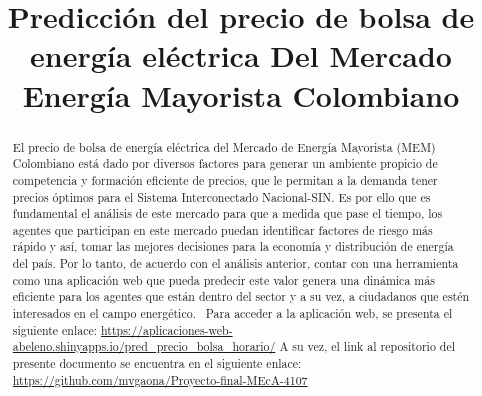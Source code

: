 \documentclass[conference, 10pt]{IEEEtran}
\begin{document}
\title{Predicción del precio de bolsa de energía eléctrica Del Mercado Energía Mayorista Colombiano}

\author{
\and
{}
}

\maketitle

\begin{abstract}
El precio de bolsa de energía eléctrica del Mercado de Energía Mayorista (MEM) Colombiano está dado por diversos factores para generar un ambiente propicio de competencia y formación eficiente de precios, que le permitan a la demanda tener precios óptimos para el Sistema Interconectado Nacional-SIN. Es por ello que es fundamental el análisis  de este mercado para que a medida que pase el tiempo, los agentes que participan en este mercado puedan identificar factores de riesgo más rápido y así, tomar las mejores decisiones para la economía y distribución de energía del país. Por lo tanto, de acuerdo con el análisis anterior, contar con una herramienta como una aplicación web que pueda predecir este valor genera una dinámica más eficiente para los agentes que están dentro del sector y a su vez, a ciudadanos que estén interesados en el campo energético. \
Para acceder a la aplicación web, se presenta el siguiente enlace: \url{https://aplicaciones-web-abeleno.shinyapps.io/pred_precio_bolsa_horario/} A su vez, el link al  repositorio del presente documento se encuentra en el siguiente enlace: \url{https://github.com/mvgaona/Proyecto-final-MEcA-4107}
\end{abstract}
\end{document}
